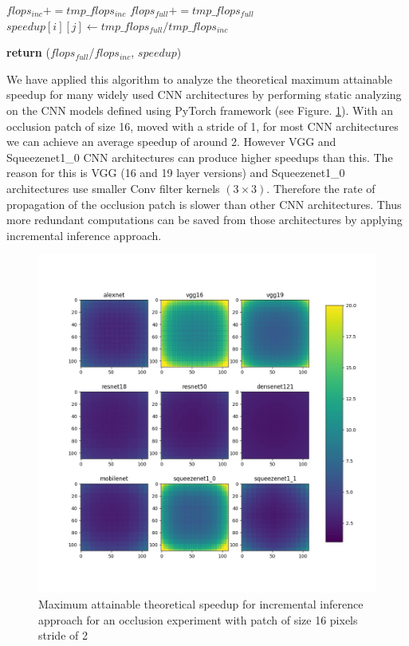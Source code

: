 \begin{algorithm}
\begin{algorithmic}[1]
      \State $flops_{inc} \mathrel{{+}{=}} tmp\_flops_{inc}$
      \State $flops_{full} \mathrel{{+}{=}} tmp\_flops_{full}$
      \State $speedup[i][j] \gets tmp\_flops_{full}/tmp\_flops_{inc}$
      
  \EndFor
\EndFor

\State \textbf{return} ($flops_{full}$/$flops_{inc}$, $speedup$)
\EndProcedure
\end{algorithmic}
\end{algorithm}

We have applied this algorithm to analyze the theoretical maximum attainable speedup for many widely used CNN architectures by performing static analyzing on the CNN models defined using PyTorch framework (see Figure. \ref{fig:speedups}).
With an occlusion patch of size 16, moved with a stride of 1, for most CNN architectures we can achieve an average speedup of around 2.
However VGG and Squeezenet1\_0 CNN architectures can produce higher speedups than this.
The reason for this is VGG (16 and 19 layer versions) and Squeezenet1\_0 architectures use smaller Conv filter kernels $(3\times3)$. Therefore the rate of propagation of the occlusion patch is slower than other CNN architectures.
Thus more redundant computations can be saved from those architectures by applying incremental inference approach.

\begin{figure}
  \includegraphics[width=\columnwidth]{./images/speedup_plots}
  \caption{Maximum attainable theoretical speedup for incremental inference approach for an occlusion experiment with patch of size 16 pixels stride of 2}
  \label{fig:speedups}
\end{figure}


